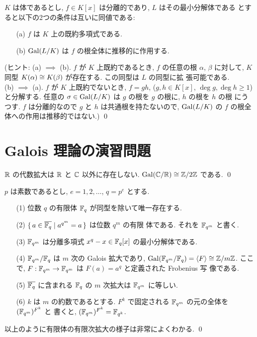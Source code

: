 \documentclass[12pt,twoside]{jarticle}
\begin{document}
\begin{question}
  $K$ は体であるとし, $f\in K[x]$ は分離的であり, $L$ はその最小分解体である
  とすると以下の2つの条件は互いに同値である:
  \begin{itemize}
  \item[(a)] $f$ は $K$ 上の既約多項式である.
  \item[(b)] $\mathop{\mathrm{Gal}}\nolimits(L/K)$ は $f$ の根全体に推移的に作用する.
  \end{itemize}
  (ヒント: (a) $\implies$ (b). $f$ が $K$ 上既約であるとき, 
  $f$ の任意の根 $\alpha$, $\beta$ に対して, 
  $K$ 同型 $K(\alpha)\cong K(\beta)$ が存在する.  この同型は $L$ の同型に拡
  張可能である. \\
  (b) $\implies$ (a). $f$ が $K$ 上既約でないとき, $f=gh$,
  ($g,h\in K[x]$, $\deg g, \deg h \ge 1$) と分解する.  
  任意の $\sigma\in\mathop{\mathrm{Gal}}\nolimits(L/K)$ は $g$ の根を $g$ の根に, $h$ の根を $h$ の根
  にうつす.  $f$ は分離的なので $g$ と $h$ は共通根を持たないので,
  $\mathop{\mathrm{Gal}}\nolimits(L/K)$ の $f$ の根全体への作用は推移的ではない.)
  \qed
\end{question}


\section{Galois 理論の演習問題}

\begin{question}
  ${\mathbb R}$ の代数拡大は ${\mathbb R}$ と ${\mathbb C}$ 以外に存在しない.
  $\mathop{\mathrm{Gal}}\nolimits({\mathbb C}/{\mathbb R})\cong{\mathbb Z}/2{\mathbb Z}$ である. 
  \qed
\end{question}

\begin{question}[有限体の性質のまとめ]
  $p$ は素数であるとし, $e=1,2,\ldots$, $q=p^e$ とする.
  \begin{itemize}
  \item[(1)] 位数 $q$ の有限体 ${\mathbb F}_q$ が同型を除いて唯一存在する. 
  \item[(2)] $\{\,a\in\overline{{\mathbb F}_q}\mid a^{q^m}=a\,\}$ は位数 $q^m$ の有限
    体である. それを ${\mathbb F}_{q^m}$ と書く.
  \item[(3)] ${\mathbb F}_{q^m}$ は分離多項式 $x^q - x\in{\mathbb F}_q[x]$ の最小分解体である.
  \item[(4)] ${\mathbb F}_{q^m}/{\mathbb F}_q$ は $m$ 次の Galois 拡大であり,
    $\mathop{\mathrm{Gal}}\nolimits({\mathbb F}_{q^m}/{\mathbb F}_q)=\langle F\rangle\cong{\mathbb Z}/m{\mathbb Z}$.
    ここで, $F:{\mathbb F}_{q^m}\to{\mathbb F}_{q^m}$ は $F(a)=a^q$ と定義された Frobenius 写
    像である.
  \item[(5)] $\overline{{\mathbb F}_q}$ に含まれる ${\mathbb F}_q$ の $m$ 次拡大は ${\mathbb F}_{q^m}$ 
    に等しい.
  \item[(6)] $k$ は $m$ の約数であるとする.
    $F^k$ で固定される ${\mathbb F}_{q^m}$ の元の全体を $({\mathbb F}_{q^m})^{F^k}$ と
    書くと, $({\mathbb F}_{q^m})^{F^k}={\mathbb F}_{q^k}$.
  \end{itemize}
  以上のように有限体の有限次拡大の様子は非常によくわかる.
  \qed
\end{question}
\end{document}
